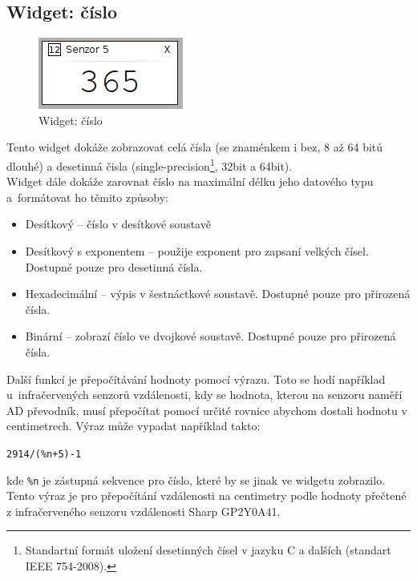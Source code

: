 \documentclass[12pt, a4paper, oneside]{article}
\begin{document}
\subsection{Widget: číslo}
\begin{figure}[h]
\begin{center}
\includegraphics[scale=1]{img/w_num.png}
\caption{Widget: číslo}
\end{center}
\end{figure}
Tento widget dokáže zobrazovat celá čísla (se znaménkem i bez, 8 až 64 bitů dlouhé) a desetinná čisla (single-precision\footnote{Standartní formát uložení desetinných čísel v jazyku C a dalších (standart IEEE 754-2008).}, 32bit a 64bit).\\
Widget dále dokáže zarovnat číslo na maximální délku jeho datového typu\\a~formátovat ho těmito způsoby:
\begin{itemize}
    \item Desítkový -- číslo v desítkové soustavě
    \item Desítkový s exponentem -- použije exponent pro zapsaní velkých čísel. Dostupné pouze pro desetinná čísla.
    \item Hexadecimální -- výpis v šestnáctkové soustavě. Dostupné pouze pro přirozená čísla. 
    \item Binární -- zobrazí číslo ve dvojkové soustavě.  Dostupné pouze pro přirozená čísla.
\end{itemize}

Další funkcí je přepočítávání hodnoty pomocí výrazu. Toto se hodí například u~infračervených senzorů vzdálenosti, kdy se hodnota, kterou na senzoru naměří AD převodník, musí přepočítat pomocí určité rovnice abychom dostali hodnotu v centimetrech. Výraz může vypadat například takto:
\begin{center}
\verb|2914/(%n+5)-1|
\end{center}
kde \verb|%n| je zástupná sekvence pro číslo, které by se jinak ve widgetu zobrazilo. Tento výraz je pro přepočítání vzdálenosti na centimetry podle hodnoty přečtené z infračerveného senzoru vzdálenosti Sharp GP2Y0A41.
\end{document}
